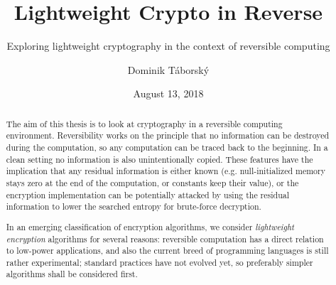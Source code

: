 \documentclass[a4paper,10pt,openright]{memoir}
\makeatletter
\newcommand{\verbatimfont}[1]{\def\verbatim@font{#1}}%
\makeatother
\begin{document}
\hypersetup{pageanchor=false}
\verbatimfont{\ttfamily\small}%

\thesiscomment{} %
\title{Lightweight Crypto in Reverse}
\subtitle{Exploring lightweight cryptography in the context of reversible computing}
\author{Dominik T\'{a}borsk\'{y}}
\date{August 13, 2018} %

\pagestyle{plain}
\maketitle

\hypersetup{pageanchor=true}
\cleardoublepage
{}
\setcounter{page}{3}

\cleardoublepage
\pagestyle{plain}
\begin{abstract}

The aim of this thesis is to look at cryptography in a reversible 
computing environment. Reversibility works on the principle that no 
information can be destroyed during the computation, so any computation 
can be traced back to the beginning. In a clean setting no information 
is also unintentionally copied. These features have the implication 
that any residual information is either known (e.g. null-initialized 
memory stays zero at the end of the computation, or constants keep 
their value), or the encryption implementation can be potentially 
attacked by using the residual information to lower the searched 
entropy for brute-force decryption.

In an emerging classification of encryption algorithms, we 
consider \textit{lightweight encryption} algorithms for several 
reasons: reversible computation has a direct relation to low-power 
applications, and also the current breed of programming languages is 
still rather experimental; standard practices have not evolved yet, so 
preferably simpler algorithms shall be considered first.

\end{abstract}

\end{document}
